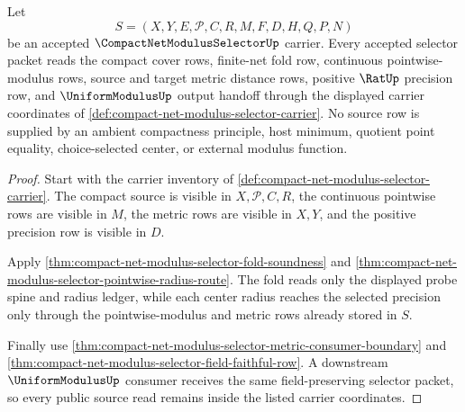 \begin{theorem}
\label{thm:compact-net-modulus-selector-source-coverage}
Let
$$
S=(X,Y,E,\mathcal{P},C,R,M,F,D,H,Q,P,N)
$$
be an accepted $\CompactNetModulusSelectorUp$ carrier. Every accepted selector packet reads the compact cover rows, finite-net fold row, continuous pointwise-modulus rows, source and target metric distance rows, positive $\RatUp$ precision row, and $\UniformModulusUp$ output handoff through the displayed carrier coordinates of \autoref{def:compact-net-modulus-selector-carrier}. No source row is supplied by an ambient compactness principle, host minimum, quotient point equality, choice-selected center, or external modulus function.
\end{theorem}
\begin{proof}
Start with the carrier inventory of \autoref{def:compact-net-modulus-selector-carrier}. The compact source is visible in $X,\mathcal{P},C,R$, the continuous pointwise rows are visible in $M$, the metric rows are visible in $X,Y$, and the positive precision row is visible in $D$.

Apply \autoref{thm:compact-net-modulus-selector-fold-soundness} and \autoref{thm:compact-net-modulus-selector-pointwise-radius-route}. The fold reads only the displayed probe spine and radius ledger, while each center radius reaches the selected precision only through the pointwise-modulus and metric rows already stored in $S$.

Finally use \autoref{thm:compact-net-modulus-selector-metric-consumer-boundary} and \autoref{thm:compact-net-modulus-selector-field-faithful-row}. A downstream $\UniformModulusUp$ consumer receives the same field-preserving selector packet, so every public source read remains inside the listed carrier coordinates.
\end{proof}

